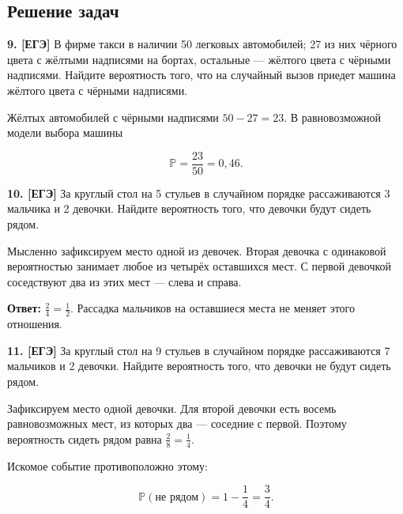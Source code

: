 \subsection{Решение задач}

\begin{task}\label{task-problems-9}
\textbf{9. [ЕГЭ]} В фирме такси в наличии 50 легковых автомобилей; 27 из них чёрного цвета с жёлтыми надписями на бортах, остальные  —  жёлтого цвета с чёрными надписями. Найдите вероятность того, что на случайный вызов приедет машина жёлтого цвета с чёрными надписями.
\end{task}

\begin{solution}\label{solution-equally-likely-outcomes-problems-9}
Жёлтых автомобилей с чёрными надписями $50-27=23$. В равновозможной модели выбора машины

\[\mathbb P=\frac{23}{50}=0,46.\]
\end{solution}

\begin{task}\label{task-problems-10}
\textbf{10. [ЕГЭ]} За круглый стол на 5 стульев в случайном порядке рассаживаются 3 мальчика и 2 девочки. Найдите вероятность того, что девочки будут сидеть рядом.
\end{task}

\begin{solution}\label{solution-equally-likely-outcomes-problems-10}
Мысленно зафиксируем место одной из девочек. Вторая девочка с одинаковой вероятностью занимает любое из четырёх оставшихся мест. С первой девочкой соседствуют два из этих мест — слева и справа.

\textbf{Ответ:} $\frac24=\frac12$. Рассадка мальчиков на оставшиеся места не меняет этого отношения.
\end{solution}

\begin{task}\label{task-problems-11}
\textbf{11. [ЕГЭ]} За круглый стол на 9 стульев в случайном порядке рассаживаются 7 мальчиков и 2 девочки. Найдите вероятность того, что девочки не будут сидеть рядом.
\end{task}

\begin{solution}\label{solution-equally-likely-outcomes-problems-11}
Зафиксируем место одной девочки. Для второй девочки есть восемь равновозможных мест, из которых два — соседние с первой. Поэтому вероятность сидеть рядом равна $\frac28=\frac14$.

Искомое событие противоположно этому:

\[\mathbb P(\text{не рядом})=1-\frac14=\frac34.\]
\end{solution}

